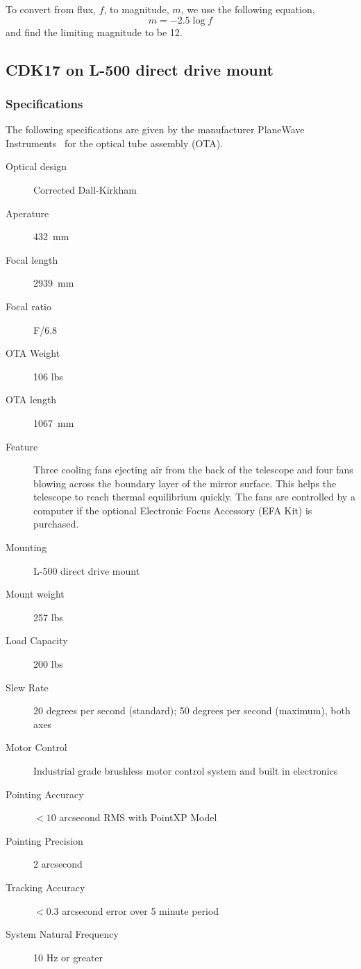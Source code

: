 To convert from flux, $f$, to magnitude, $m$, we use the following equation,
\begin{equation}
    m = -2.5 \log{f}
    \label{eq:flux2mag}
\end{equation}
and find the limiting magnitude to be 12.

\subsection{CDK17 on L-500 direct drive mount}
\subsubsection{Specifications}
The following specifications are given by the manufacturer PlaneWave Instruments~\cite{cdk17} for the optical tube assembly (OTA).
\begin{description}
    \item[Optical design] Corrected Dall-Kirkham
    \item[Aperature] \SI{432}{\milli\meter}
    \item[Focal length] \SI{2939}{\milli\meter}
    \item[Focal ratio] F/6.8
    \item[OTA Weight] 106 lbs
    \item[OTA length] \SI{1067}{\milli\meter}
    \item[Feature] Three cooling fans ejecting air from the back of the telescope and four fans blowing across the boundary layer of the mirror surface. This helps the telescope to reach thermal equilibrium quickly. The fans are controlled by a computer if the optional Electronic Focus Accessory (EFA Kit) is purchased.
    \item[Mounting] L-500 direct drive mount
    \item[Mount weight] 257 lbs
    \item[Load Capacity] 200 lbs
    \item[Slew Rate] 20 degrees per second (standard); 50 degrees per second (maximum), both axes
    \item[Motor Control] Industrial grade brushless motor control system and built in electronics
    \item[Pointing Accuracy] $<10$ arcsecond RMS with PointXP Model
    \item[Pointing Precision] 2 arcsecond
    \item[Tracking Accuracy] $< 0.3$ arcsecond error over 5 minute period
    \item[System Natural Frequency] 10 Hz or greater
    \end{description}

